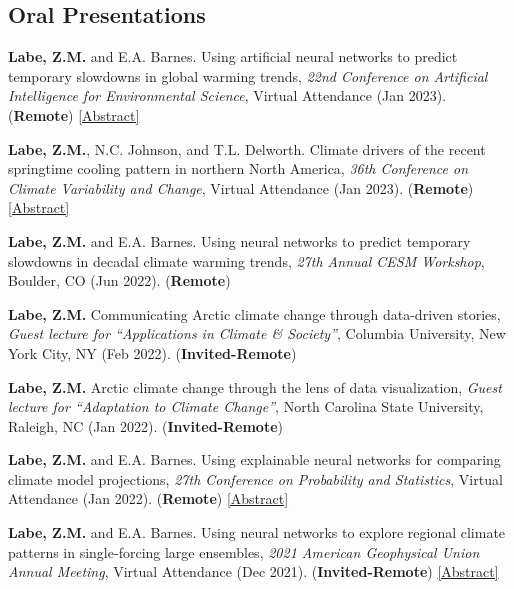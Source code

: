 \documentclass[margin,line,palatino,courier,10pt]{res}
\begin{document}
\begin{resume}
\section{\sc \textcolor{Cerulean}{\large{\textbf{Oral Presentations}}}}
\begin{etaremune}[leftmargin=0in,topsep=0in,parsep=0in]
\item \textbf{Labe, Z.M.} and E.A. Barnes. Using artificial neural networks to predict temporary slowdowns in global warming trends, \textit{22nd Conference on Artificial Intelligence for Environmental Science}, Virtual Attendance (Jan 2023). (\textbf{Remote}) \href{https://ams.confex.com/ams/103ANNUAL/meetingapp.cgi/Paper/415460}{[Abstract]}
\item \textbf{Labe, Z.M.}, N.C. Johnson, and T.L. Delworth. Climate drivers of the recent springtime cooling pattern in northern North America, \textit{36th Conference on Climate Variability and Change}, Virtual Attendance (Jan 2023). (\textbf{Remote}) \href{https://ams.confex.com/ams/103ANNUAL/meetingapp.cgi/Paper/415409}{[Abstract]}
\item \textbf{Labe, Z.M.} and E.A. Barnes. Using neural networks to predict temporary slowdowns in decadal climate warming trends, \textit{27th Annual CESM Workshop}, Boulder, CO (Jun 2022). (\textbf{Remote})
\item \textbf{Labe, Z.M.} Communicating Arctic climate change through data-driven stories, \textit{Guest lecture for ``Applications in Climate \& Society''}, Columbia University, New York City, NY (Feb 2022). (\textbf{Invited-Remote}) 
\item \textbf{Labe, Z.M.} Arctic climate change through the lens of data visualization, \textit{Guest lecture for ``Adaptation to Climate Change''}, North Carolina State University, Raleigh, NC (Jan 2022). (\textbf{Invited-Remote}) 
\item \textbf{Labe, Z.M.} and E.A. Barnes. Using explainable neural networks for comparing climate model projections, \textit{27th Conference on Probability and Statistics}, Virtual Attendance (Jan 2022). (\textbf{Remote}) \href{https://ams.confex.com/ams/102ANNUAL/meetingapp.cgi/Paper/392538}{[Abstract]}
\item \textbf{Labe, Z.M.} and E.A. Barnes. Using neural networks to explore regional climate patterns in single-forcing large ensembles, \textit{2021 American Geophysical Union Annual Meeting}, Virtual Attendance (Dec 2021). (\textbf{Invited-Remote}) \href{https://agu.confex.com/agu/fm21/meetingapp.cgi/Paper/798039}{[Abstract]}

\end{etaremune}
\end{resume}
\end{document}
